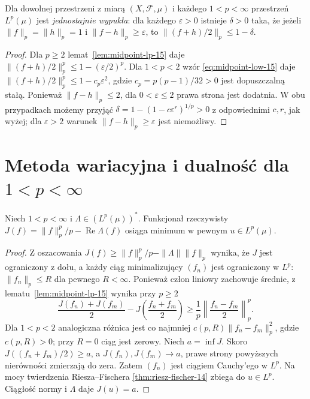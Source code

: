\begin{twierdzenie}
\label{thm:uniform-convexity-15}
Dla dowolnej przestrzeni z miarą $(X,\mathcal F,\mu)$
i każdego $1<p<\infty$ przestrzeń $L^p(\mu)$ jest
\emph{jednostajnie wypukła}: dla każdego $\varepsilon>0$
istnieje $\delta>0$ taka, że jeżeli $\|f\|_p=\|h\|_p=1$
i $\|f-h\|_p\ge\varepsilon$, to
$\|(f+h)/2\|_p\le1-\delta$.
\end{twierdzenie}
\begin{proof}
Dla $p\ge2$ lemat~\ref{lem:midpoint-lp-15} daje
$\|(f+h)/2\|_p^p\le1-(\varepsilon/2)^p$.
Dla $1<p<2$ wzór \eqref{eq:midpoint-low-15} daje
$\|(f+h)/2\|_p^p\le1-c_p\varepsilon^2$,
gdzie $c_p=p(p-1)/32>0$ jest dopuszczalną stałą.
Ponieważ $\|f-h\|_p\le2$, dla $0<\varepsilon\le2$
prawa strona jest dodatnia. W obu przypadkach
możemy przyjąć $\delta=1-(1-c\varepsilon^r)^{1/p}>0$
z odpowiednimi $c,r$, jak wyżej; dla $\varepsilon>2$
warunek $\|f-h\|_p\ge\varepsilon$ jest niemożliwy.
\end{proof}

\section{Metoda wariacyjna i dualność dla $1<p<\infty$}
\begin{lemat}
\label{lem:variational-lp-15}
Niech $1<p<\infty$ i $\Lambda\in(L^p(\mu))^*$.
Funkcjonał rzeczywisty
$J(f)=\|f\|_p^p/p-\operatorname{Re}\Lambda(f)$
osiąga minimum w pewnym $u\in L^p(\mu)$.
\end{lemat}
\begin{proof}
Z oszacowania $J(f)\ge\|f\|_p^p/p-\|\Lambda\|\|f\|_p$
wynika, że $J$ jest ograniczony z dołu, a każdy ciąg
minimalizujący $(f_n)$ jest ograniczony w $L^p$:
$\|f_n\|_p\le R$ dla pewnego $R<\infty$.
Ponieważ człon liniowy zachowuje średnie, z
lematu~\ref{lem:midpoint-lp-15} wynika przy $p\ge2$
\[
\frac{J(f_n)+J(f_m)}2-J\left(\frac{f_n+f_m}{2}\right)
\ge\frac1p\left\|\frac{f_n-f_m}{2}\right\|_p^p.
\]
Dla $1<p<2$ analogiczna różnica jest co najmniej
$c(p,R)\|f_n-f_m\|_p^2$, gdzie $c(p,R)>0$;
przy $R=0$ ciąg jest zerowy. Niech $a=\inf J$.
Skoro $J((f_n+f_m)/2)\ge a$, a $J(f_n),J(f_m)\to a$,
prawe strony powyższych nierówności zmierzają do zera.
Zatem $(f_n)$ jest ciągiem Cauchy'ego w $L^p$.
Na mocy twierdzenia Riesza--Fischera
\ref{thm:riesz-fischer-14} zbiega do $u\in L^p$.
Ciągłość normy i $\Lambda$ daje $J(u)=a$.
\end{proof}

